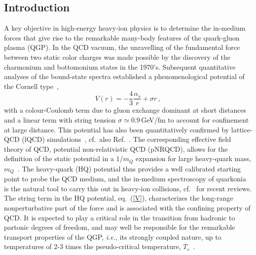 \documentclass[../report.tex]{subfiles}
\begin{document}
\subsection{Introduction} %
\label{sec_intro}
A key objective in high-energy heavy-ion physics is to determine the in-medium forces 
that give rise to the remarkable many-body features of the quark-gluon plasma (QGP).
In the QCD vacuum, the unravelling of the fundamental force between two static color charges  
was made possible by the discovery of the charmonium and bottomonium states in the 1970's. 
Subsequent quantitative analyses of the bound-state spectra established a phenomenological 
potential of the Cornell type~\cite{Eichten:1979ms}, 
\begin{equation}
V(r) = -\frac{4}{3} \frac{\alpha_s}{r} + \sigma r \ ,
\label{V}
\end{equation} 
with a colour-Coulomb term due to gluon exchange dominant at short distances and a linear term 
with string tension $\sigma\simeq0.9$\,GeV/fm to account for confinement at large distance. 
This potential has also been quantitatively confirmed 
by lattice-QCD (lQCD) simulations~\cite{Bali:2000gf}, cf.~also Ref.~\cite{Brambilla:2004jw}. 
The corresponding effective field theory of QCD, potential non-relativistic QCD (pNRQCD), 
allows for the definition of the static potential in a  $1/m_Q$ expansion for large 
heavy-quark mass, $m_Q$~\cite{Brambilla:1999xf,Brambilla:2004wf}. 
The heavy-quark (HQ) potential thus provides a well calibrated starting point to probe the 
QCD medium, and the in-medium spectroscopy of quarkonia is the natural tool to carry this 
out in heavy-ion collisions, cf.~\cite{Rapp:2008tf,BraunMunzinger:2009ih,Kluberg:2009wc,Mocsy:2013syh,Liu:2015izf} 
for recent reviews.
The string term in the HQ potential, eq.~(\ref{V}), characterizes the long-range nonperturbative 
part of the force and is associated with the confining property of QCD. It is expected to play 
a critical role in the transition from hadronic to partonic degrees of freedom, and may well be 
responsible for the remarkable transport properties of the QGP, {\it i.e.}, its strongly coupled 
nature, up to temperatures of 2-3 times the pseudo-critical temperature, $T_c$~\cite{Liu:2016ysz}. 
\end{document}
